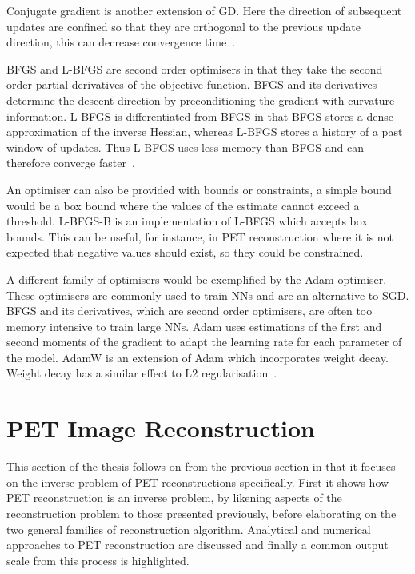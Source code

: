                 Conjugate gradient is another extension of \gls{GD}. Here the direction of subsequent updates are confined so that they are orthogonal to the previous update direction, this can decrease convergence time~\parencite{Tustison2009}. %
                
                \gls{BFGS} and \gls{L-BFGS} are second order optimisers in that they take the second order partial derivatives of the objective function. \gls{BFGS} and its derivatives determine the descent direction by preconditioning the gradient with curvature information. \gls{L-BFGS} is differentiated from \gls{BFGS} in that \gls{BFGS} stores a dense approximation of the inverse Hessian, whereas \gls{L-BFGS} stores a history of a past window of updates. Thus \gls{L-BFGS} uses less memory than \gls{BFGS} and can therefore converge faster~\parencite{Fletcher2000PracticalOptimization}.
                
                An optimiser can also be provided with bounds or constraints, a simple bound would be a box bound where the values of the estimate cannot exceed a threshold. \gls{L-BFGS-B} is an implementation of \gls{L-BFGS} which accepts box bounds. This can be useful, for instance, in \gls{PET} reconstruction where it is not expected that negative values should exist, so they could be constrained.

                A different family of optimisers would be exemplified by the Adam optimiser. These optimisers are commonly used to train \glspl{NN} and are an alternative to \gls{SGD}. \gls{BFGS} and its derivatives, which are second order optimisers, are often too memory intensive to train large \glspl{NN}. Adam uses estimations of the first and second moments of the gradient to adapt the learning rate for each parameter of the model. AdamW is an extension of Adam which incorporates weight decay. Weight decay has a similar effect to L$2$ regularisation~\parencite{Loshchilov2019DecoupledRegularization}.
            
    \section{PET Image Reconstruction} \label{sec:pet_image_reconstruction}
        This section of the thesis follows on from the previous section in that it focuses on the inverse problem of \gls{PET} reconstructions specifically. First it shows how \gls{PET} reconstruction is an inverse problem, by likening aspects of the reconstruction problem to those presented previously, before elaborating on the two general families of reconstruction algorithm. Analytical and numerical approaches to \gls{PET} reconstruction are discussed and finally a common output scale from this process is highlighted.
            
